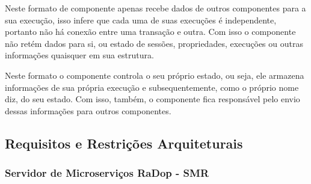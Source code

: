 Neste formato de componente apenas recebe dados de outros componentes
para a sua execução, isso infere que cada uma de suas execuções é
independente, portanto não há conexão entre uma transação e outra. Com
isso o componente não retém dados para si, ou estado de sessões,
propriedades, execuções ou outras informações quaisquer em sua
estrutura.

\label{statefull}

Neste formato o componente controla o seu próprio estado, ou seja, ele
armazena informações de sua própria execução e subsequentemente, como o
próprio nome diz, do seu estado. Com isso, também, o componente fica
responsável pelo envio dessas informações para outros componentes.

\subsection{Requisitos e Restrições Arquiteturais}\label{requisitos-e-restricoes-arquiteturais}

\subsubsection{Servidor de Microserviços RaDop - SMR}\label{req-servidor-de-microservicos-radop---smr}

